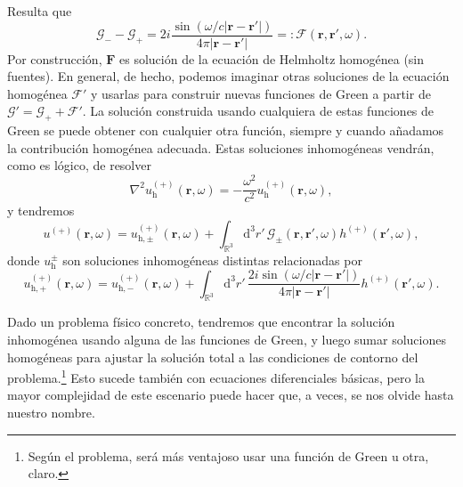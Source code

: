 \begin{example}
    Resulta que 
    \begin{equation}
        \mathcal{G}_- - \mathcal{G}_+ = 2i\frac{\sin(\omega/c|\mathbf{r}-\mathbf{r}'|)}{4\pi|\mathbf{r}-\mathbf{r}'|} =: \mathcal{F}(\mathbf{r}, \mathbf{r}', \omega).
    \end{equation}
    Por construcción, \(\mathbf{F}\) es solución de la ecuación de Helmholtz homogénea (sin fuentes). En general, de hecho, podemos imaginar otras soluciones de la ecuación homogénea \(\mathcal{F}'\) y usarlas para construir nuevas funciones de Green a partir de \(\mathcal{G}' = \mathcal{G}_+ + \mathcal{F}'\). La solución construida usando cualquiera de estas funciones de Green se puede obtener con cualquier otra función, siempre y cuando añadamos la contribución homogénea adecuada. Estas soluciones inhomogéneas vendrán, como es lógico, de resolver
    \begin{equation*}
        \nabla^2u^{(+)}_\mathrm{h}(\mathbf{r}, \omega) = - \frac{\omega^2}{c^2}u^{(+)}_\mathrm{h}(\mathbf{r}, \omega),
    \end{equation*}
    y tendremos
    \begin{equation*}
        u^{(+)}(\mathbf{r}, \omega) = u^{(+)}_{\mathrm{h},\pm}(\mathbf{r}, \omega) + \int_{\mathbb{R}^3}\mathrm{d}^3r'\, \mathcal{G}_\pm (\mathbf{r}, \mathbf{r}', \omega) h^{(+)}(\mathbf{r'},\omega),
    \end{equation*}
    donde \(u^{\pm}_\mathrm{h}\) son soluciones inhomogéneas distintas relacionadas por
    \begin{equation*}
        u_{\mathrm{h},+}^{(+)}(\mathbf{r},\omega) = u_{\mathrm{h},-}^{(+)}(\mathbf{r},\omega) + \int_{\mathbb{R}^3}\mathrm{d}^3r'\,\frac{2i\sin(\omega/c|\mathbf{r}-\mathbf{r}'|)}{4\pi|\mathbf{r}-\mathbf{r}'|} h^{(+)}(\mathbf{r}',\omega).
    \end{equation*}

    Dado un problema físico concreto, tendremos que encontrar la solución inhomogénea usando alguna de las funciones de Green, y luego sumar soluciones homogéneas para ajustar la solución total a las condiciones de contorno del problema.\footnote{Según el problema, será más ventajoso usar una función de Green u otra, claro.} Esto sucede también con ecuaciones diferenciales básicas, pero la mayor complejidad de este escenario puede hacer que, a veces, se nos olvide hasta nuestro nombre. 




\end{example}
